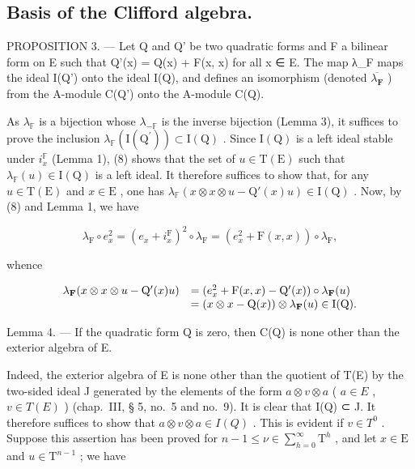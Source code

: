 \subsection{Basis of the Clifford algebra.}

PROPOSITION 3. --- Let Q and Q' be two quadratic forms and F a bilinear form on E such that Q'(x) = Q(x) + F(x, x) for all x ∈ E. The map λ\_F maps the ideal I(Q') onto the ideal I(Q), and defines an isomorphism (denoted \(\overline{\lambda_{\mathbf{F}}}\) ) from the A-module C(Q') onto the A-module C(Q).

As \(\lambda_{\mathbb{F}}\) is a bijection whose \(\lambda_{-\mathbb{F}}\) is the inverse bijection (Lemma 3), it suffices to prove the inclusion \(\lambda_{\mathbb{F}}(\mathrm{I}(\mathrm{Q}^{\prime})) \subset \mathrm{I}(\mathrm{Q})\) . Since \(\mathrm{I}(\mathrm{Q})\) is a left ideal stable under \(i_x^{\mathbb{F}}\) (Lemma 1), (8) shows that the set of \(u \in \mathrm{T}(\mathrm{E})\) such that \(\lambda_{\mathbb{F}}(u) \in \mathrm{I}(\mathrm{Q})\) is a left ideal. It therefore suffices to show that, for any \(u \in \mathrm{T}(\mathrm{E})\) and \(x \in \mathrm{E}\) , one has \(\lambda_{\mathbb{F}}(x \otimes x \otimes u - \mathrm{Q}'(x)u) \in \mathrm{I}(\mathrm{Q})\) . Now, by (8) and Lemma 1, we have

\[
\lambda_ {\mathrm{F}} \circ e _ {x} ^ {2} = (e _ {x} + i _ {x} ^ {\mathrm{F}}) ^ {2} \circ \lambda_ {\mathrm{F}} = (e _ {x} ^ {2} + \mathrm{F} (x, x)) \circ \lambda_ {\mathrm{F}},
\]

whence

\[
\begin{array}{r l} \lambda_ {\mathbf {F}} (x \otimes x \otimes u - \mathrm{Q} ^ {\prime} (x) u) & = (e _ {x} ^ {2} + \mathrm{F} (x, x) - \mathrm{Q} ^ {\prime} (x)) \circ \lambda_ {\mathbf {F}} (u) \\ & = (x \otimes x - \mathrm{Q} (x)) \otimes \lambda_ {\mathbf {F}} (u) \in \mathrm{I} (\mathrm{Q}). \end{array}
\]

Lemma 4. — If the quadratic form Q is zero, then C(Q) is none other than the exterior algebra of E.

Indeed, the exterior algebra of E is none other than the quotient of T(E) by the two-sided ideal J generated by the elements of the form \(a \otimes v \otimes a\) ( \(a \in E\) , \(v \in T(E)\) ) (chap.~III, § 5, no.~5 and no.~9). It is clear that I(Q) ⊂ J. It therefore suffices to show that \(a \otimes v \otimes a \in I(Q)\) . This is evident if \(v \in T^0\) . Suppose this assertion has been proved for \(n-1 \leqslant \nu \in \sum_{h=0}^{\infty} \mathrm{T}^{h}\) , and let \(x \in \mathrm{E}\) and \(u \in \mathrm{T}^{n-1}\) ; we have

